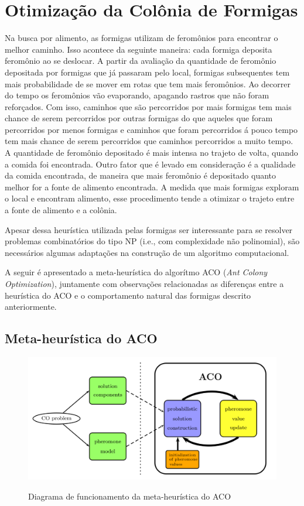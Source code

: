 \section{Otimização da Colônia de Formigas}

Na busca por alimento, as formigas utilizam de feromônios para encontrar o melhor caminho.
Isso acontece da seguinte maneira: cada formiga deposita feromônio ao se deslocar. A partir
da avaliação da quantidade de feromônio depositada por formigas que já passaram pelo local,
formigas subsequentes tem mais probabilidade de se mover em rotas que tem mais feromônios. Ao
decorrer do tempo os feromônios vão evaporando, apagando rastros que não foram reforçados. 
Com isso, caminhos que são percorridos por mais formigas tem mais chance de serem 
percorridos por outras formigas do que aqueles que foram percorridos por menos formigas e 
caminhos que foram percorridos á pouco tempo tem mais chance de serem percorridos que caminhos
percorridos a muito tempo. A quantidade de feromônio depositado é mais intensa no trajeto de volta,
quando a comida foi encontrada. Outro fator que é levado em consideração é a qualidade da comida
encontrada, de maneira que mais feromônio é depositado quanto melhor for a fonte de alimento encontrada.
A medida que mais formigas exploram o local e encontram alimento, esse procedimento tende a otimizar o
trajeto entre a fonte de alimento e a colônia.

Apesar dessa heurística utilizada pelas formigas ser interessante para se resolver problemas combinatórios 
do tipo NP (i.e., com complexidade não polinomial), são necessários algumas adaptações na construção
de um algoritmo computacional.

A seguir é apresentado a meta-heurística do algorítmo ACO (\textit{Ant Colony Optimization}),
juntamente com observações relacionadas as diferenças entre a heurística do ACO e o
comportamento natural das formigas descrito anteriormente.

\subsection{Meta-heurística do ACO}

\begin{figure}[ht]
  \includegraphics[width = 0.9 \linewidth]{imgs/meta_heuristica_aco}
  \label{diagrama_metaheuristica_aco}
  \caption{Diagrama de funcionamento da meta-heurística do ACO \cite{blum2005aco}}
\end{figure}

